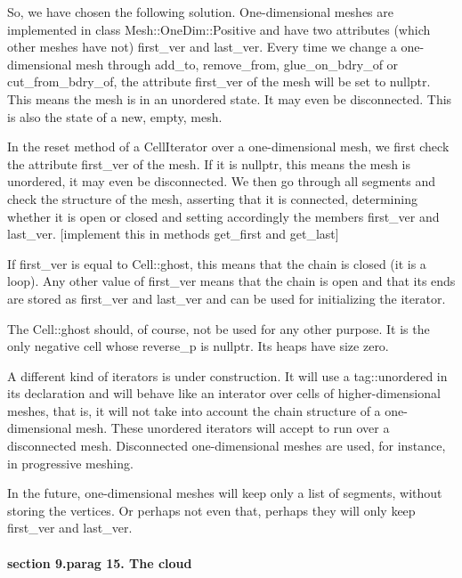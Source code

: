 So, we have chosen the following solution.
One-dimensional meshes are implemented in class {\codett Mesh::OneDim::Positive} and have
two attributes (which other meshes have not) {\codett first\_ver} and {\codett last\_ver}.
Every time we change a one-dimensional mesh through {\codett add\_to},
{\codett remove\_from}, {\codett glue\_on\_bdry\_of} or {\codett cut\_from\_bdry\_of},
the attribute {\codett first\_ver} of the mesh will be set to {\codett nullptr}.
This means the mesh is in an unordered state.
It may even be disconnected.
This is also the state of a new, empty, mesh.

In the {\codett reset} method of a {\codett CellIterator} over a one-dimensional mesh,
we first check the attribute {\codett first\_ver} of the mesh.
If it is {\codett nullptr}, this means the mesh is unordered, it may even be disconnected.
We then go through all segments and check the structure of the mesh, 
{\codett assert}ing that it is connected, determining whether it is open or closed
and setting accordingly the members {\codett first\_ver} and {\codett last\_ver}.
[implement this in methods {\codett get\_first} and {\codett get\_last}]

If {\codett first\_ver} is equal to {\codett Cell::ghost}, this means that the chain
is closed (it is a loop).
Any other value of {\codett first\_ver} means that the chain is open and that its
ends are stored as {\codett first\_ver} and {\codett last\_ver} and can be used for
initializing the iterator.

The {\codett Cell::ghost} should, of course, not be used for any other purpose.
It is the only negative cell whose {\codett reverse\_p} is {\codett nullptr}.
Its {\codett heap}s have size zero.

A different kind of iterators is under construction.
It will use a {\codett tag::unordered} in its declaration and will behave like an interator
over cells of higher-dimensional meshes, that is, it will not take into account the chain
structure of a one-dimensional mesh.
These {\codett unordered} iterators will accept to run over a disconnected mesh.
Disconnected one-dimensional meshes are used, for instance, in progressive meshing.

In the future, one-dimensional meshes will keep only a list of segments,
without storing the vertices.
Or perhaps not even that, perhaps they will only keep {\codett first\_ver} and
{\codett last\_ver}.


\paragraph{\numb section 9.\numb parag 15. The cloud}

